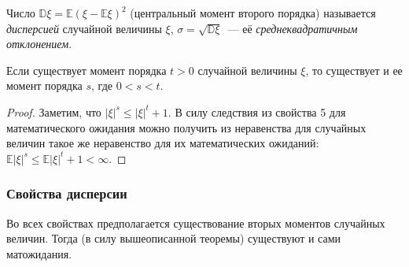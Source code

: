 \begin{defn}
    Число $\mathbb{D}\xi = \mathbb{E}(\xi - \mathbb{E}\xi)^2$ (центральный момент второго порядка) называется {\it дисперсией} случайной величины $\xi$, $\sigma = \sqrt{\mathbb{D}\xi}$~--- её {\it среднеквадратичным отклонением}.
\end{defn} 

\begin{thm*}
    Если существует момент порядка $t > 0$ случайной величины $\xi$, то существует и ее момент порядка $s$, где $0 < s < t$.
\end{thm*}

\begin{proof} 
Заметим, что $|\xi|^s \leqslant |\xi|^t + 1.$ В силу следствия из свойства 5 для математического ожидания можно получить из неравенства для случайных величин такое же неравенство для их математических ожиданий: $\mathbb{E}|\xi|^s \leqslant \mathbb{E}|\xi|^t + 1 < \infty.$
\end{proof}

\subsubsection{Свойства дисперсии}

\begin{rmrk}
        Во всех свойствах предполагается существование вторых моментов случайных величин. Тогда (в силу вышеописанной теоремы) существуют и сами матожидания.
\end{rmrk} 

